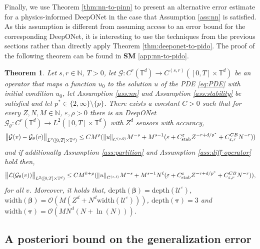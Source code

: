 \documentclass{article}
\numberwithin{equation}{section}
\newcommand{\width}{\mathrm{width}}
\newcommand{\depth}{\mathrm{depth}}
\newcommand{\T}{\mathbb{T}}
\newcommand{\N}{\mathbb{N}}
\newcommand{\cG}{\mathcal{G}}
\newcommand{\cL}{\mathcal{L}}
\newcommand{\cU}{\mathcal{U}}
\newcommand{\trunk}{{\bm{\tau}}}
\newcommand{\branch}{{\bm{\beta}}}
\renewcommand{\epsilon}{\varepsilon}
\newcommand{\1}{\mathbbm{1}}
\newcommand{\bigO}{\mathcal{O}}
\newtheorem{theorem}{Theorem}[section]
\begin{document}
Finally, we use Theorem \ref{thm:nn-to-pinn} to present an alternative error estimate for a physics-informed DeepONet in the case that Assumption \ref{ass:nn} is satisfied. As this assumption is different from assuming access to an error bound for the corresponding DeepONet, it is interesting to use the techniques from the previous sections rather than directly apply Theorem \ref{thm:deeponet-to-pido}. The proof of the following theorem can be found in \textbf{SM} \ref{app:nn-to-pido}. 

\begin{theorem}\label{thm:nn-to-pido}
Let $s,r\in\N$, $T>0$, let $\cG: C^r(\T^d)\to C^{(s,r)}([0,T]\times \T^d)$ be an operator that maps a function $u_0$ to the solution $u$ of the PDE \eqref{eq:PDE} with initial condition $u_0$, let Assumption \ref{ass:nn} and Assumption \ref{ass:stability} be satisfied {\color{black}and let $p^*\in\{2,\infty\}\setminus\{p\}$}. There exists a constant $C>0$ such that for every $Z,N,M\in\N$, $\epsilon, \rho>0$ there is an DeepONet $\cG_\theta: C^r(\T^d)\to L^2([0,T]\times\T^d)$ with $Z^d$ sensors with accuracy, 
\begin{equation}
    \norm{\cG(v)-\cG_\theta(v)}_{L^2([0,T]\times\T^d)} \leq CM^{\rho}(\norm{u}_{C^{(s,0)}}M^{-s}+M^{s-1}(\epsilon+C^\epsilon_{\mathrm{stab}}Z^{-r+d/p^*}+C^{CB}_{\epsilon,r}N^{-r}))
\end{equation}
and if additionally Assumption \ref{ass:partition} and Assumption \ref{ass:diff-operator} hold then,
\begin{equation}
    \norm{\cL(\cG_\theta(v))}_{L^2([0,T]\times\T^d)} \leq CM^{k+\rho}(\norm{u}_{C^{(s,\ell)}}M^{-s}+M^{s-1}N^\ell(\epsilon+C^\epsilon_{\mathrm{stab}}Z^{-r+d/p^*}+C^{CB}_{\epsilon,r}N^{-r})), 
\end{equation}
for all $v$. Moreover, it holds that, $\depth(\branch)=\depth(\cU^\epsilon)$, $\width(\branch) = \bigO(M(Z^d+N^d\width(\cU^\epsilon)))$, 
$\depth(\trunk) = 3$ and $\width(\trunk) = \bigO(MN^d(N+\ln(N)))$. 
\end{theorem}

\subsection{A posteriori bound on the generalization error}\label{sec:generalization}
\end{document}
